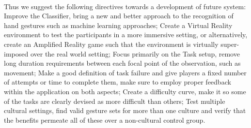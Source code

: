     \\
    Thus we suggest the following directives towards a development of future system: Improve the Classifier, bring a new and better approach to the recognition of hand gestures such as machine learning approaches; Create a Virtual Reality environment to test the participants in a more immersive setting, or alternatively, create an Amplified Reality game such that the environment is virtually super-imposed over the real world setting; Focus primarily on the Task setup, remove long duration requirements between each focal point of the observation, such as movement; Make a good definition of task failure and give players a fixed number of attempts or time to complete them, make sure to employ proper feedback within the application on both aspects; Create a difficulty curve, make it so some of the tasks are clearly devised as more difficult than others; Test multiple cultural settings, find valid gesture sets for more than one culture and verify that the benefits permeate all of these over a non-cultural control group.\\
    